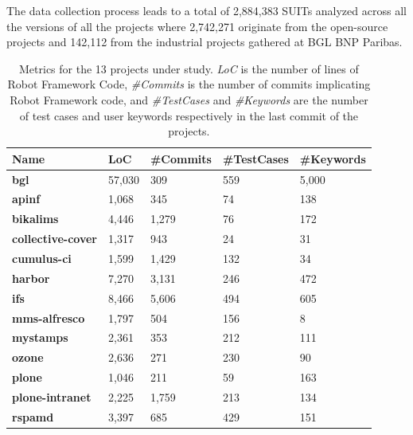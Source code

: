 The data collection process leads to a total of 2,884,383 SUITs analyzed across all the versions of all the projects where 2,742,271 originate from the open-source projects and 142,112 from the industrial projects gathered at BGL BNP Paribas.

\begin{table}
\centering

\caption{Metrics for the 13 projects under study. \emph{LoC} is the number of lines of Robot Framework Code, \emph{\#Commits} is the number of commits implicating Robot Framework code, and \emph{\#TestCases} and \emph{\#Keywords} are the number of test cases and user keywords respectively in the last commit of the projects.}
\label{tab:projects}

\begin{tabular}{>{\raggedright}p{0.9in}>{\raggedleft}p{0.7in}>{\raggedleft}p{0.7in}>{\raggedleft}p{0.7in}>{\raggedleft}p{0.7in}}

\toprule
\scriptsize{\textbf{Name}} & \scriptsize{\textbf{LoC}} & \scriptsize{\textbf{\#Commits}} & \scriptsize{\textbf{\#TestCases}} & \scriptsize{\textbf{\#Keywords}} \tabularnewline
\toprule

\scriptsize{\textbf{bgl}} & \scriptsize{57,030} & \scriptsize{309} & \scriptsize{559} & \scriptsize{5,000} \tabularnewline

\midrule

\scriptsize{\textbf{apinf}} & \scriptsize{1,068} & \scriptsize{345} & \scriptsize{74} & \scriptsize{138} \tabularnewline
\scriptsize{\textbf{bikalims}} & \scriptsize{4,446} & \scriptsize{1,279} & \scriptsize{76} & \scriptsize{172} \tabularnewline
\scriptsize{\textbf{collective-cover}} & \scriptsize{1,317} & \scriptsize{943} & \scriptsize{24} & \scriptsize{31} \tabularnewline
\scriptsize{\textbf{cumulus-ci}} & \scriptsize{1,599} & \scriptsize{1,429} & \scriptsize{132} & \scriptsize{34} \tabularnewline
\scriptsize{\textbf{harbor}} & \scriptsize{7,270} & \scriptsize{3,131} & \scriptsize{246} & \scriptsize{472} \tabularnewline
\scriptsize{\textbf{ifs}} & \scriptsize{8,466} & \scriptsize{5,606} & \scriptsize{494} & \scriptsize{605} \tabularnewline
\scriptsize{\textbf{mms-alfresco}} & \scriptsize{1,797} & \scriptsize{504} & \scriptsize{156} & \scriptsize{8} \tabularnewline
\scriptsize{\textbf{mystamps}} & \scriptsize{2,361} & \scriptsize{353} & \scriptsize{212} & \scriptsize{111} \tabularnewline
\scriptsize{\textbf{ozone}} & \scriptsize{2,636} & \scriptsize{271} & \scriptsize{230} & \scriptsize{90} \tabularnewline
\scriptsize{\textbf{plone}} & \scriptsize{1,046} & \scriptsize{211} & \scriptsize{59} & \scriptsize{163} \tabularnewline
\scriptsize{\textbf{plone-intranet}} & \scriptsize{2,225} & \scriptsize{1,759} & \scriptsize{213} & \scriptsize{134} \tabularnewline
\scriptsize{\textbf{rspamd}} & \scriptsize{3,397} & \scriptsize{685} & \scriptsize{429} & \scriptsize{151} \tabularnewline

\bottomrule

\end{tabular}

\end{table}

